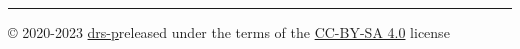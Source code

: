 \documentclass[a4paper, landscape, 10pt]{article}
\begin{document}
\begin{multicols*}{3}
    {
        \color{solarizedbase00}\vfill\hrule\par%
        {\noindent\rule{0pt}{8pt}\footnotesize © 2020-2023 \href{https://github.com/drs-p/}{drs-p}\hfill released under the terms of the \href{https://creativecommons.org/licenses/by-sa/4.0/}{{CC-BY-SA 4.0}} license}\par
    }

\end{multicols*}
\end{document}

